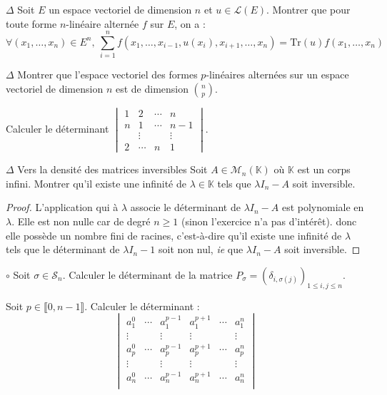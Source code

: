 \documentclass[french,a4paper]{article}
\newcommand{\K}{\mathbb{K}}
\newcommand{\Tr}{\text{Tr}}
\theoremstyle{plain}
\theoremstyle{definition}
\theoremstyle{remark}
\begin{document}
\begin{ex}{$\Delta$}
	Soit $E$ un espace vectoriel de dimension $n$ et $u\in\mathcal{L}(E)$. Montrer que pour toute forme $n$-linéaire alternée $f$ sur $E$, on a : $$\forall (x_1,\ldots,x_n)\in E^n,\ \sum_{i=1}^{n}f(x_1,\ldots,x_{i-1},u(x_i),x_{i+1},\ldots,x_n)=\Tr(u)f(x_1,\ldots,x_n)$$
\end{ex}

\begin{ex}{$\Delta$}
	Montrer que l'espace vectoriel des formes $p$-linéaires alternées sur un espace vectoriel de dimension $n$ est de dimension $\displaystyle\binom{n}{p}$.
\end{ex}

\begin{ex}{}
	Calculer le déterminant $\displaystyle\begin{vmatrix}
		1&2&\cdots&n\\
		n&1&\cdots&n-1\\
		&\vdots&&\vdots\\
		2&\cdots&n&1
	\end{vmatrix}$.
\end{ex}

\begin{ex}{$\Delta$ Vers la densité des matrices inversibles}
	Soit $A\in\mathcal{M}_n(\K)$ où $\K$ est un corps infini. Montrer qu'il existe une infinité de $\lambda\in\K$ tels que $\lambda I_n-A$ soit inversible.
\end{ex}
\begin{proof}
	L'application qui à $\lambda$ associe le déterminant de $\lambda I_n-A$ est polynomiale en $\lambda$. Elle est non nulle car de degré $n\geqslant 1$ (sinon l'exercice n'a pas d'intérêt). donc elle possède un nombre fini de racines, c'est-à-dire qu'il existe une infinité de $\lambda$ tels que le déterminant de $\lambda I_n-1$ soit non nul, \textit{ie} que $\lambda I_n-A$ soit inversible.
\end{proof}

\begin{ex}{$\circ$}
	Soit $\sigma\in\mathcal{S}_n$. Calculer le déterminant de la matrice $P_\sigma=\left(\delta_{i,\sigma(j)}\right)_{1\leqslant i,j\leqslant n}$.
\end{ex}

\begin{ex}{}
	Soit $p\in\llbracket0,n-1\rrbracket$. Calculer le déterminant : $$\begin{vmatrix}
		a_1^0&\cdots&a_1^{p-1}&a_1^{p+1}&\cdots&a_1^n\\
		\vdots&&\vdots&\vdots&&\vdots\\
		a_p^0&\cdots&a_p^{p-1}&a_p^{p+1}&\cdots&a_p^n\\
		\vdots&&\vdots&\vdots&&\vdots\\
		a_n^0&\cdots&a_n^{p-1}&a_n^{p+1}&\cdots&a_n^n\\
	\end{vmatrix}$$
\end{ex}
\end{document}
